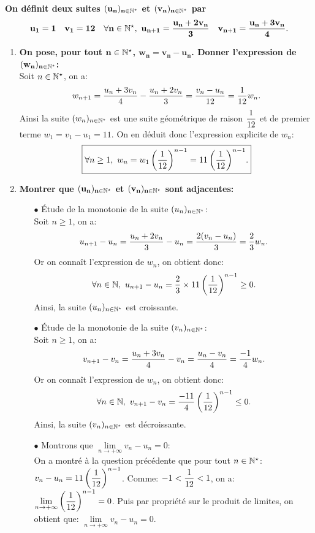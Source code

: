 \documentclass[a4paper, 11pt]{article}
\begin{document}
\begin{correction} \;
\textbf{On d\'efinit deux suites $\mathbf{(u_n)_{n\in\mathbb{N}^{\star}}}$ et $\mathbf{(v_n)_{n\in\mathbb{N}^{\star}}}$ par }
$$\mathbf{u_1=1\quad v_1=12\quad \forall n\in\mathbb{N}^{\star},\ u_{n+1}=\displaystyle\frac{u_n+2v_n}{3}\quad v_{n+1}=\displaystyle\frac{u_n+3v_n}{4}.}$$
\begin{enumerate}
\item \textbf{On pose, pour tout $\mathbf{n\in\mathbb{N}^{\star}}$, $\mathbf{w_n=v_n-u_n}$. Donner l'expression de $\mathbf{(w_n)_{n\in\mathbb{N}^{\star}}}$:}\\
\noindent Soit $n\in\mathbb{N}^{\star}$, on a: 
$$w_{n+1}=\displaystyle\frac{u_n+3v_n}{4}-\displaystyle\frac{u_n+2v_n}{3}=\displaystyle\frac{v_n-u_n}{12}=\displaystyle\frac{1}{12}w_n.$$
Ainsi la suite $(w_n)_{n\in\mathbb{N}^{\star}}$ est une suite g\'eom\'etrique de raison $\displaystyle\frac{1}{12}$ et de premier terme $w_1=v_1-u_1=11$. On en d\'eduit donc l'expression explicite de $w_n$:
$$\fbox{$\forall n\geq 1,\ w_n=w_1\left( \displaystyle\frac{1}{12}  \right)^{n-1}=11\left( \displaystyle\frac{1}{12}  \right)^{n-1}$.}$$
\item \textbf{Montrer que $\mathbf{(u_n)_{n\in\mathbb{N}^{\star}}}$ et $\mathbf{(v_n)_{n\in\mathbb{N}^{\star}}}$ sont adjacentes:}
\begin{itemize}
\item[$\bullet$] \'Etude de la monotonie de la suite $(u_n)_{n\in\mathbb{N}^{\star}}$:\\
\noindent Soit $n\geq 1$, on a:
$$u_{n+1}-u_n=\displaystyle\frac{u_n+2v_n}{3}-u_n=\displaystyle\frac{2(v_n-u_n)}{3}=\displaystyle\frac{2}{3}w_n.$$
Or on conna\^{i}t l'expression de $w_n$, on obtient donc:
$$\forall n\in\N,\ u_{n+1}-u_n=\ddp\frac{2}{3} \times 11\left( \ddp\frac{1}{12}  \right)^{n-1}  \geq 0.$$
Ainsi, la suite $(u_n)_{n\in\mathbb{N}^{\star}}$ est croissante.
\item[$\bullet$] \'Etude de la monotonie de la suite $(v_n)_{n\in\mathbb{N}^{\star}}$:\\
\noindent Soit $n\geq 1$, on a:
$$v_{n+1}-v_n=\displaystyle\frac{u_n+3v_n}{4}-v_n=\displaystyle\frac{u_n-v_n}{4}=\displaystyle\frac{-1}{4}w_n.$$
Or on conna\^{i}t l'expression de $w_n$, on obtient donc:
$$\forall n\in\N,\ v_{n+1}-v_n=\ddp\frac{-11}{4} \left( \ddp\frac{1}{12}  \right)^{n-1}  \leq 0.$$
Ainsi, la suite $(v_n)_{n\in\mathbb{N}^{\star}}$ est d\'ecroissante.
\item[$\bullet$] Montrons que $\lim\limits_{n\to +\infty} v_n-u_n=0$:\\
\noindent On a montr\'e \`{a} la question pr\'ec\'edente que pour tout $n\in\mathbb{N}^{\star}$: $v_n-u_n=11\left( \displaystyle\frac{1}{12}  \right)^{n-1}$. Comme: $-1<\displaystyle\frac{1}{12}<1$, on a: $\lim\limits_{n\to +\infty } \left( \displaystyle\frac{1}{12} \right)^{n-1} =0$. Puis par propri\'et\'e sur le produit de limites, on obtient que: $\lim\limits_{n\to +\infty} v_n-u_n=0$.

\end{itemize}
\end{enumerate}
\end{correction}
\end{document}
